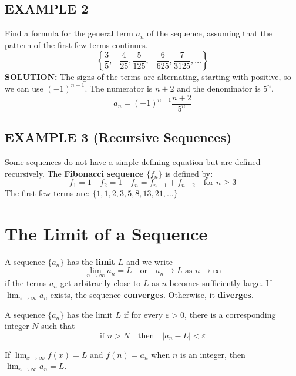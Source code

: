 \documentclass{article}
\theoremstyle{mystyle}
\begin{document}
\subsection*{EXAMPLE 2}
Find a formula for the general term \(a_n\) of the sequence, assuming that the pattern of the first few terms continues.
\[ \left\{\dfrac{3}{5}, -\dfrac{4}{25}, \dfrac{5}{125}, -\dfrac{6}{625}, \dfrac{7}{3125}, \dots \right\} \]
\textbf{SOLUTION:} The signs of the terms are alternating, starting with positive, so we can use \( (-1)^{n-1} \). The numerator is \(n+2\) and the denominator is \(5^n\).
\[ a_n = (-1)^{n-1}\dfrac{n+2}{5^n} \]

\subsection*{EXAMPLE 3 (Recursive Sequences)}
Some sequences do not have a simple defining equation but are defined recursively. The \textbf{Fibonacci sequence} \(\{f_n\}\) is defined by:
\[ f_1 = 1 \quad f_2 = 1 \quad f_n = f_{n-1} + f_{n-2} \quad \text{for } n \ge 3 \]
The first few terms are: \(\{1, 1, 2, 3, 5, 8, 13, 21, \dots\}\)

\section*{The Limit of a Sequence}
\begin{tcolorbox}[colback=white, colframe=orange!80!white, title=Definition of a Limit of a Sequence (Intuitive), boxrule=0.5mm, arc=3mm]
A sequence \(\{a_n\}\) has the \textbf{limit} \(L\) and we write
\[ \lim_{n\to\infty} a_n = L \quad \text{or} \quad a_n \to L \text{ as } n \to \infty \]
if the terms \(a_n\) get arbitrarily close to \(L\) as \(n\) becomes sufficiently large. If \( \lim_{n\to\infty} a_n \) exists, the sequence \textbf{converges}. Otherwise, it \textbf{diverges}.
\end{tcolorbox}

\begin{tcolorbox}[colback=white, colframe=orange!80!white, title=Definition of a Limit of a Sequence (Precise), boxrule=0.5mm, arc=3mm]
A sequence \(\{a_n\}\) has the limit \(L\) if for every \( \varepsilon > 0 \), there is a corresponding integer \(N\) such that
\[ \text{if } n > N \quad \text{then} \quad |a_n - L| < \varepsilon \]
\end{tcolorbox}

\begin{tcolorbox}[colback=white, colframe=orange!80!white, title=Theorem 1, boxrule=0.5mm, arc=3mm]
If \( \lim_{x\to\infty} f(x) = L \) and \(f(n) = a_n\) when \(n\) is an integer, then \( \lim_{n\to\infty} a_n = L \).
\end{tcolorbox}
\end{document}
